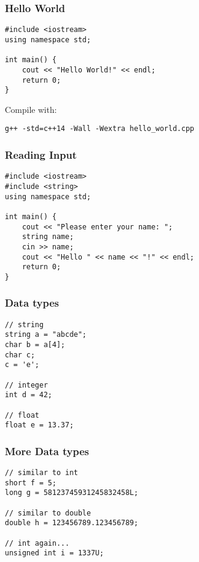 \begin{frame}[fragile]
    \frametitle{Hello World}
\begin{lstlisting}
#include <iostream>
using namespace std;

int main() {
    cout << "Hello World!" << endl;
    return 0;
}
\end{lstlisting}
Compile with:
\begin{lstlisting}[numbers=none]
g++ -std=c++14 -Wall -Wextra hello_world.cpp
\end{lstlisting}
\end{frame}

\begin{frame}[fragile]
    \frametitle{Reading Input}
\begin{lstlisting}
#include <iostream>
#include <string>
using namespace std;

int main() {
    cout << "Please enter your name: ";
    string name;
    cin >> name;
    cout << "Hello " << name << "!" << endl;
    return 0;
}
\end{lstlisting}
\end{frame}

\begin{frame}[fragile]
    \frametitle{Data types}
\begin{lstlisting}
// string
string a = "abcde";
char b = a[4];
char c;
c = 'e';

// integer
int d = 42;

// float
float e = 13.37;
\end{lstlisting}
\end{frame}

\begin{frame}[fragile]
    \frametitle{More Data types}
\begin{lstlisting}
// similar to int
short f = 5;
long g = 58123745931245832458L;

// similar to double
double h = 123456789.123456789;

// int again...
unsigned int i = 1337U;
\end{lstlisting}
\end{frame}


